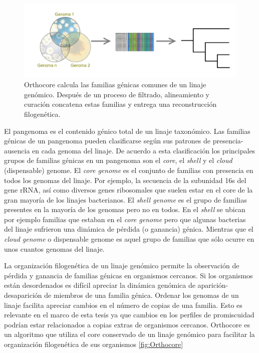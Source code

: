 \documentclass[12pt,twoside]{reedthesis}
\begin{document}
  \begin{figure}[h!tbp]
  \centering
  \includegraphics[angle = 0,scale = .42]{chapter1/coreWiki.png}
  \caption[Orthocore calcula el core de un linaje genómico para proveer una filogenia]{\footnotesize{Orthocore calcula las familias génicas comunes de un linaje genómico. Después de un proceso de filtrado, alineamiento y curación concatena estas familias y entrega una reconstrucción filogenética.}}
  \label{fig:Orthocore}
  \end{figure}
  
  El pangenoma es el contenido génico total de un linaje taxonómico. Las
  familias génicas de un pangenoma pueden clasificarse según sus patrones
  de presencia-ausencia en cada genoma del linaje. De acuerdo a esta
  clasificación los principales grupos de familias génicas en un pangenoma
  son el \emph{core}, el \emph{shell} y el \emph{cloud} (dispensable)
  genome. El \emph{core genome} es el conjunto de familias con presencia
  en todos los genomas del linaje. Por ejemplo, la secuencia de la
  subunidad 16s del gene rRNA, así como diversos genes ribosomales que
  suelen estar en el core de la gran mayoría de los linajes bacterianos.
  El \emph{shell genome} es el grupo de familias presentes en la mayoría
  de los genomas pero no en todos. En el \emph{shell} se ubican por
  ejemplo familias que estaban en el \emph{core genome} pero que algunas
  bacterias del linaje sufrieron una dinámica de pérdida (o ganancia)
  génica. Mientras que el \emph{cloud genome} o dispensable genome es
  aquel grupo de familias que sólo ocurre en unos cuantos genomas del
  linaje.
  
  La organización filogenética de un linaje genómico permite la
  observación de pérdida y ganancia de familias génicas en organismos
  cercanos. Si los organismos están desordenados es difícil apreciar la
  dinámica genómica de aparición-desaparición de miembros de una familia
  génica. Ordenar los genomas de un linaje facilita apreciar cambios en el
  número de copias de una familia. Esto es relevante en el marco de esta
  tesis ya que cambios en los perfiles de promiscuidad podrían estar
  relacionados a copias extras de organismos cercanos. Orthocore es un
  algoritmo que utiliza el core conservado de un linaje genómico para
  facilitar la organización filogenética de sus organismos
  \autoref{fig:Orthocore}
  
\end{document}
